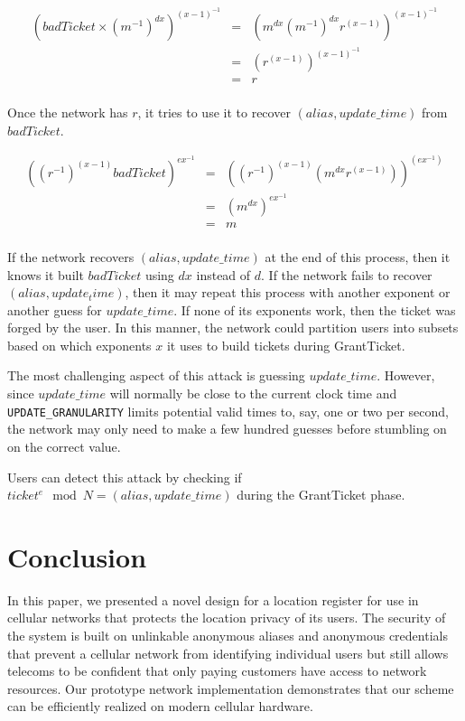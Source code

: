 \documentclass[11pt]{article}
\begin{document}
\begin{eqnarray*}
	(badTicket \times (m^{-1})^{dx})^{(x-1)^{-1}} & = 
	& (m^{dx}(m^{-1})^{dx}r^{(x-1)})^{(x-1)^{-1}} \\
	& = & (r^{(x-1)})^{(x-1)^{-1}} \\
	& = & r \\
\end{eqnarray*}

Once the network has $r$, it tries to use it to recover $(alias, update\_time)$ from $badTicket$.

\begin{eqnarray*}
	((r^{-1})^{(x-1)}badTicket)^{ex^{-1}} & = 
	& ((r^{-1})^{(x-1)}(m^{dx}r^{(x-1)}))^{(ex^{-1})} \\
	& = & (m^{dx})^{ex^{-1}} \\
	& = & m \\
\end{eqnarray*}

If the network recovers $(alias, update\_time)$ at the end of this process, then it knows it built $badTicket$ using $dx$ instead of $d$. If the network fails to recover $(alias, update_time)$, then it may repeat this process with another exponent or another guess for $update\_time$. If none of its exponents work, then the ticket was forged by the user. In this manner, the network could partition users into subsets based on which exponents $x$ it uses to build tickets during GrantTicket.

The most challenging aspect of this attack is guessing $update\_time$. However, since $update\_time$ will normally be close to the current clock time and \texttt{UPDATE_GRANULARITY} limits potential valid times to, say, one or two per second, the network may only need to make a few hundred guesses before stumbling on on the correct value.

Users can detect this attack by checking if $ticket^e \mod N = (alias, update\_time)$ during the GrantTicket phase.
\section{Conclusion}

In this paper, we presented a novel design for a location register for use in cellular networks that protects the location privacy of its users. The security of the system is built on unlinkable anonymous aliases and anonymous credentials that prevent a cellular network from identifying individual users but still allows telecoms to be confident that only paying customers have access to network resources. Our prototype network implementation demonstrates that our scheme can be efficiently realized on modern cellular hardware.
\end{document}
